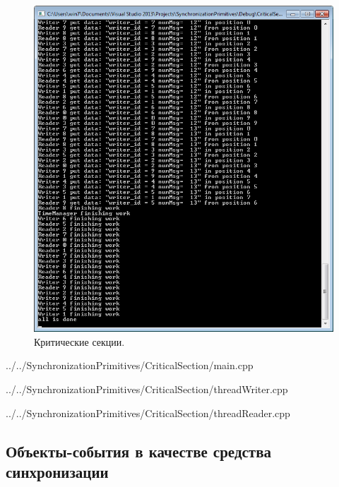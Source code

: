 \documentclass[a4paper, 12pt]{article}		%
\begin{document}
\begin{figure}[h!]
\centering
\includegraphics[scale=1]{res/003}
\caption{Критические секции.}
\end{figure}


{../../SynchronizationPrimitives/CriticalSection/main.cpp}


{../../SynchronizationPrimitives/CriticalSection/threadWriter.cpp}


{../../SynchronizationPrimitives/CriticalSection/threadReader.cpp}

\newpage
\subsection{Объекты-события в качестве средства синхронизации}
\end{document}
